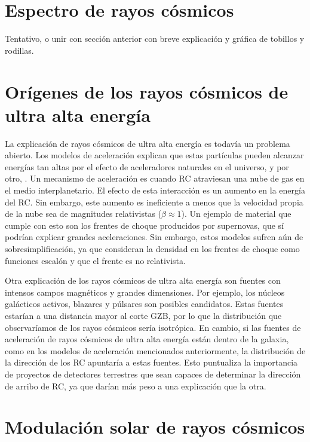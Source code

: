 \documentclass{book}
\begin{document}
\section{Espectro de rayos c\'osmicos}
Tentativo, o unir con secci\'on anterior con breve explicaci\'on y gr\'afica de tobillos y rodillas.

\section{Or\'igenes de los rayos c\'osmicos de ultra alta energ\'ia}

La explicaci\'on de rayos c\'osmicos de ultra alta energ\'ia es todav\'ia un problema abierto. Los modelos de aceleraci\'on explican que estas part\'iculas pueden alcanzar energ\'ias tan altas por el efecto de aceleradores naturales en el universo, y por otro, . Un mecanismo de aceleraci\'on es cuando RC atraviesan una nube de gas en el medio interplanetario. El efecto de esta interacci\'on es un aumento en la energ\'ia del RC. Sin embargo, este aumento es ineficiente a menos que la velocidad propia de la nube sea de magnitudes relativistas ($\beta\approx1$). Un ejemplo de material que cumple con esto son los frentes de choque producidos por supernovas, que s\'i podr\'ian explicar grandes aceleraciones. Sin embargo, estos modelos sufren a\'un de sobresimplificaci\'on, ya que consideran la densidad en los frentes de choque como funciones escal\'on y que el frente es no relativista.\citep{ASOREY}

Otra explicaci\'on de los rayos c\'osmicos de ultra alta energ\'ia son fuentes con intensos campos magn\'eticos y grandes dimensiones. Por ejemplo, los n\'ucleos gal\'acticos activos, blazares y p\'ulsares son posibles candidatos. Estas fuentes estar\'ian a una distancia mayor al corte GZB, por lo que la distribuci\'on que observar\'iamos de los rayos c\'osmicos ser\'ia isotr\'opica. En cambio, si las fuentes de aceleraci\'on de rayos c\'osmicos de ultra alta energ\'ia est\'an dentro de la galaxia, como en los modelos de aceleraci\'on mencionados anteriormente, la distribuci\'on de la direcci\'on de los RC apuntar\'ia a estas fuentes. Esto puntualiza la importancia de proyectos de detectores terrestres que sean capaces de determinar la direcci\'on de arribo de RC, ya que dar\'ian m\'as peso a una explicaci\'on que la otra. \citep{PEREZ}

\section{Modulaci\'on solar de rayos c\'osmicos}
\end{document}
